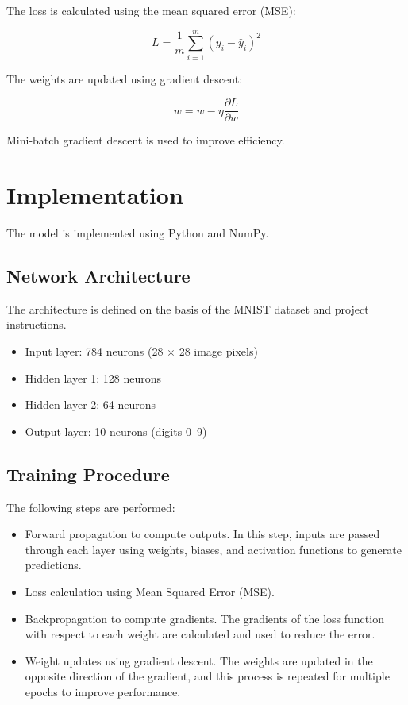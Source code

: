 \documentclass[runningheads]{llncs}
\begin{document}
The loss is calculated using the mean squared error (MSE):

\[
L = \frac{1}{m} \sum_{i=1}^{m} (y_i - \hat{y}_i)^2
\]

The weights are updated using gradient descent:

\[
w = w - \eta \frac{\partial L}{\partial w}
\]

Mini-batch gradient descent is used to improve efficiency.

\section{Implementation}
The model is implemented using Python and NumPy.

\subsection{Network Architecture}
The architecture is defined on the basis of\textbf{} the MNIST dataset and project instructions.

\begin{itemize}
\item Input layer: 784 neurons (28 $\times$ 28 image pixels)
\item Hidden layer 1: 128 neurons
\item Hidden layer 2: 64 neurons
\item Output layer: 10 neurons (digits 0--9)
\end{itemize}

\subsection{Training Procedure}
The following steps are performed:

\begin{itemize}
\item Forward propagation to compute outputs. In this step, inputs are passed through each layer using weights, biases, and activation functions to generate predictions.

\item Loss calculation using Mean Squared Error (MSE).

\item Backpropagation to compute gradients. The gradients of the loss function with respect to each weight are calculated and used to reduce the error.

\item Weight updates using gradient descent. The weights are updated in the opposite direction of the gradient, and this process is repeated for multiple epochs to improve performance.
\end{itemize}
\end{document}
